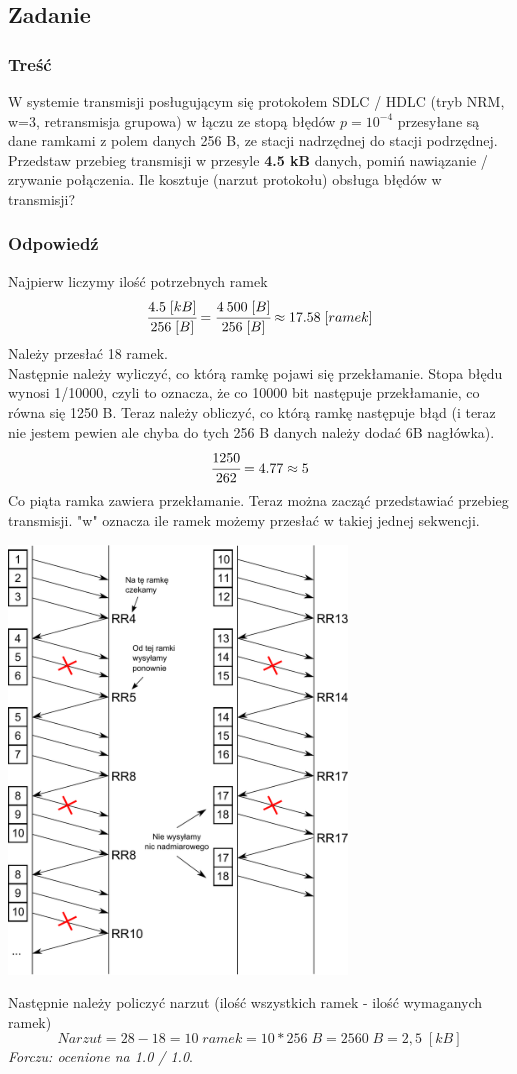 \documentclass[a4paper,twoside]{article}
\begin{document}
\newpage
\subsection{Zadanie}
\subsubsection{Treść}
W systemie transmisji posługującym się protokołem SDLC / HDLC (tryb NRM, w=3, retransmisja grupowa) w łączu ze stopą błędów $ p=10^{-4} $ przesyłane są dane ramkami z polem danych 256 B, ze stacji nadrzędnej do stacji podrzędnej. Przedstaw przebieg transmisji w przesyle \textbf{4.5 kB} danych, pomiń nawiązanie / zrywanie połączenia. Ile kosztuje (narzut protokołu) obsługa błędów w transmisji?
\subsubsection{Odpowiedź}
Najpierw liczymy ilość potrzebnych ramek
$$ \cfrac{4.5\;[kB]}{256\;[B]}=\cfrac{4\:500\;[B]}{256\;[B]}\approx17.58\;[ramek] $$Należy przesłać 18 ramek.\\
Następnie należy wyliczyć, co którą ramkę pojawi się przekłamanie. Stopa błędu wynosi 1/10000, czyli to oznacza, że co 10000 bit następuje przekłamanie, co równa się 1250 B. Teraz należy obliczyć, co którą ramkę następuje błąd (i teraz nie jestem pewien ale chyba do tych 256 B danych należy dodać 6B nagłówka).
$$ \cfrac{1250}{262}={4.77}\approx5 $$
Co piąta ramka zawiera przekłamanie. Teraz można zacząć przedstawiać przebieg transmisji. "w" oznacza ile ramek możemy przesłać w takiej jednej sekwencji.
\begin{center}
	\includegraphics[width=9.0cm]{./images/zadanie09.pdf}
\end{center}
Następnie należy policzyć narzut (ilość wszystkich ramek - ilość wymaganych ramek)\\
$$ Narzut = 28 - 18  = 10\;ramek = 10 * 256\;B = 2560\;B =2,5\; [kB] $$
\small{ \emph{Forczu: ocenione na 1.0 / 1.0}}.
\end{document}
